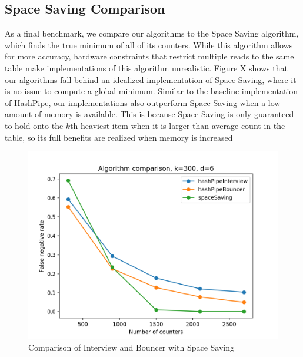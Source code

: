 \subsection{Space Saving Comparison}
As a final benchmark, we compare our algorithms to the Space Saving algorithm, which finds the true minimum of all of its counters. While this algorithm allows for more accuracy, hardware constraints that restrict multiple reads to the same table make implementations of this algorithm unrealistic. Figure X shows that our algorithms fall behind an idealized implementation of Space Saving, where it is no issue to compute a global minimum. Similar to the baseline implementation of HashPipe, our implementations also outperform Space Saving when a low amount of memory is available. This is because Space Saving is only guaranteed to hold onto the $k$th heaviest item when it is larger than average count in the table, so its full benefits are realized when memory is increased
\begin{figure}[t]
  \centering
    \includegraphics[scale=0.42]{spacesaver}
     \caption{Comparison of Interview and Bouncer with Space Saving}
     \label{fig:bp-image}
\end{figure}